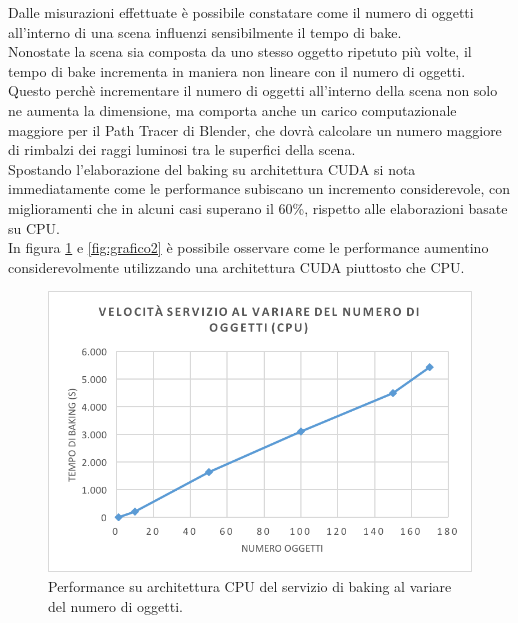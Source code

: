 Dalle misurazioni effettuate è possibile constatare come il numero di oggetti all’interno di una scena influenzi sensibilmente il tempo di bake. 
\\
Nonostate la scena sia composta da uno stesso oggetto ripetuto più volte, il tempo di bake incrementa in maniera non lineare con il numero di oggetti.
\\ 
Questo perchè incrementare il numero di oggetti all’interno della scena non solo ne aumenta la dimensione, ma comporta anche un carico computazionale maggiore per il Path Tracer di Blender, che dovrà calcolare un numero maggiore di rimbalzi dei raggi luminosi tra le superfici della scena.
\\
Spostando l’elaborazione del baking su architettura CUDA si nota immediatamente come le performance subiscano un incremento considerevole, con miglioramenti che in alcuni casi superano il 60\%, rispetto alle elaborazioni basate su CPU. 
\\
In figura \ref{fig:grafico1} e \ref{fig:grafico2} è possibile osservare come le performance aumentino considerevolmente utilizzando una architettura CUDA piuttosto che CPU.
\\
\begin{figure}[htb]
 \centering
 \includegraphics[width=0.8\linewidth]{images/chapter_prove_sperimentali/grafico1.png}\hfill
 \caption[Performance CPU variando oggetti]{Performance su architettura CPU del servizio di baking al variare del numero di oggetti.}
 \label{fig:grafico1}
\end{figure}
\\
